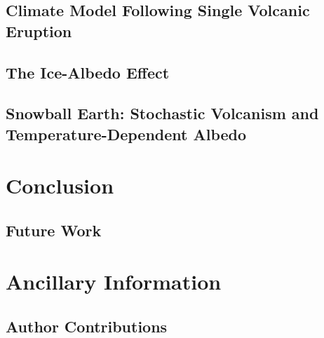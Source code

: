 \documentclass[12pt]{article}
\begin{document}
\subsection{Climate Model Following Single Volcanic Eruption}
\subsection{The Ice-Albedo Effect}
\subsection{Snowball Earth: Stochastic Volcanism and Temperature-Dependent Albedo}
\label{sec:snowballearth}

\section{Conclusion}
\subsection{Future Work}

\section{Ancillary Information}
\subsection{Author Contributions}
\end{document}
